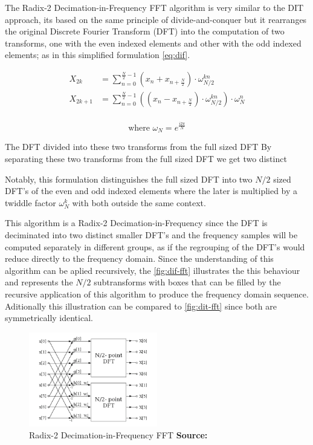 \documentclass[
  oneside,
  11pt, a4paper,
  footinclude=true,
  headinclude=true,
  cleardoublepage=empty
]{scrbook}
\newcommand*{\source}[1]{%
    \textbf{Source:} \cite{#1}%
}
\begin{document}
The Radix-2 Decimation-in-Frequency FFT algorithm is very similar to the DIT approach, its based on the same principle of divide-and-conquer but it rearranges the original Discrete Fourier Transform (DFT) into the computation of two transforms, one with the even indexed elements and other with the odd indexed elements; as in this simplified formulation \autoref{eq:dif}.

\begin{equation} \label{eq:dif}
    \begin{aligned}
        X_{2k} &= \sum_{n=0}^{\frac{N}{2}-1} (x_{n} + x_{n + \frac{N}{2}}) \cdot \omega_{N/2}^{kn} \\
        X_{2k+1} &= \sum_{n=0}^{\frac{N}{2}-1} ((x_{n} - x_{n + \frac{N}{2}}) \cdot \omega_{N/2}^{kn}) \cdot \omega_{N}^{n} \\
    \end{aligned}
\end{equation}

\begin{equation*}
    \text{where } \omega_{N} = e^{\frac{i 2 \pi}{N}}
\end{equation*}

The DFT divided into these two transforms from the full sized DFT
By separating these two transforms from the full sized DFT we get two distinct 

Notably, this formulation distinguishes the full sized DFT into two \(N/2\) sized DFT's of the even and odd indexed elements where the later is multiplied by a twiddle factor \( \omega_{N}^{k} \) with both outside the same context. 

This algorithm is a Radix-2 Decimation-in-Frequency since the DFT is deciminated into two distinct smaller DFT's and the frequency samples will be computed separately in different groups, as if the regrouping of the DFT's would reduce directly to the frequency domain. Since the understanding of this algorithm can be aplied recursively, the \autoref{fig:dif-fft} illustrates the this behaviour and represents the \(N/2\) subtransforms with boxes that can be filled by the recursive application of this algorithm to produce the frequency domain sequence. Aditionally this illustration can be compared to \autoref{fig:dit-fft} since both are symmetrically identical.

\begin{figure}[h] 
    \centering
    \includegraphics[width=0.5\textwidth]{img/dif_fft.png}
    \caption{Radix-2 Decimation-in-Frequency FFT \source{jones2014digital}}
    \label{fig:dif-fft}
\end{figure}
\end{document}
